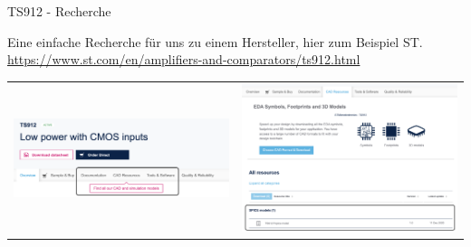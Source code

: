 \begin{frame}[t]{TS912 - Recherche}

    Eine einfache Recherche für uns zu einem Hersteller, hier zum Beispiel ST.
    \href{https://www.st.com/en/amplifiers-and-comparators/ts912.html}{https://www.st.com/en/amplifiers-and-comparators/ts912.html}


    \begin{spacing}{0.9} \begin{tiny}
            \begin{table}[h!]
                \begin{tabular}{p{5cm} p{5cm}}
                    \begin{minipage}{0.5\textwidth}
                        \includegraphics[width=\linewidth]{pictures/spice_model_search.png}
                    \end{minipage}
                     &
                    \begin{minipage}{0.5\textwidth}
                        \includegraphics[width=\linewidth]{pictures/spice_model_search2.png}
                    \end{minipage}
                \end{tabular}
            \end{table}
        \end{tiny} \end{spacing}

\end{frame}

